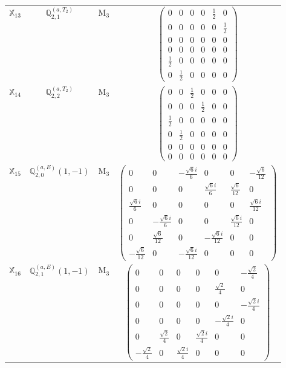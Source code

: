 \documentclass[fleqn,10pt,landscape]{article}
\begin{document}
\begin{itemize}
\begin{center}
\begin{longtable}{c|c|c|c}
$ \mathbb{X}_{13} $ & $\mathbb{Q}_{2,1}^{(a,T_{2})}$ & M$_{3}$ & $\begin{pmatrix} 0 & 0 & 0 & 0 & \frac{1}{2} & 0 \\ 0 & 0 & 0 & 0 & 0 & \frac{1}{2} \\ 0 & 0 & 0 & 0 & 0 & 0 \\ 0 & 0 & 0 & 0 & 0 & 0 \\ \frac{1}{2} & 0 & 0 & 0 & 0 & 0 \\ 0 & \frac{1}{2} & 0 & 0 & 0 & 0 \end{pmatrix}$ \\
$ \mathbb{X}_{14} $ & $\mathbb{Q}_{2,2}^{(a,T_{2})}$ & M$_{3}$ & $\begin{pmatrix} 0 & 0 & \frac{1}{2} & 0 & 0 & 0 \\ 0 & 0 & 0 & \frac{1}{2} & 0 & 0 \\ \frac{1}{2} & 0 & 0 & 0 & 0 & 0 \\ 0 & \frac{1}{2} & 0 & 0 & 0 & 0 \\ 0 & 0 & 0 & 0 & 0 & 0 \\ 0 & 0 & 0 & 0 & 0 & 0 \end{pmatrix}$ \\
$ \mathbb{X}_{15} $ & $\mathbb{Q}_{2,0}^{(a,E)}(1,-1)$ & M$_{3}$ & $\begin{pmatrix} 0 & 0 & - \frac{\sqrt{6} i}{6} & 0 & 0 & - \frac{\sqrt{6}}{12} \\ 0 & 0 & 0 & \frac{\sqrt{6} i}{6} & \frac{\sqrt{6}}{12} & 0 \\ \frac{\sqrt{6} i}{6} & 0 & 0 & 0 & 0 & \frac{\sqrt{6} i}{12} \\ 0 & - \frac{\sqrt{6} i}{6} & 0 & 0 & \frac{\sqrt{6} i}{12} & 0 \\ 0 & \frac{\sqrt{6}}{12} & 0 & - \frac{\sqrt{6} i}{12} & 0 & 0 \\ - \frac{\sqrt{6}}{12} & 0 & - \frac{\sqrt{6} i}{12} & 0 & 0 & 0 \end{pmatrix}$ \\
$ \mathbb{X}_{16} $ & $\mathbb{Q}_{2,1}^{(a,E)}(1,-1)$ & M$_{3}$ & $\begin{pmatrix} 0 & 0 & 0 & 0 & 0 & - \frac{\sqrt{2}}{4} \\ 0 & 0 & 0 & 0 & \frac{\sqrt{2}}{4} & 0 \\ 0 & 0 & 0 & 0 & 0 & - \frac{\sqrt{2} i}{4} \\ 0 & 0 & 0 & 0 & - \frac{\sqrt{2} i}{4} & 0 \\ 0 & \frac{\sqrt{2}}{4} & 0 & \frac{\sqrt{2} i}{4} & 0 & 0 \\ - \frac{\sqrt{2}}{4} & 0 & \frac{\sqrt{2} i}{4} & 0 & 0 & 0 \end{pmatrix}$ \\

\end{longtable}
\end{center}
\end{itemize}
\end{document}
